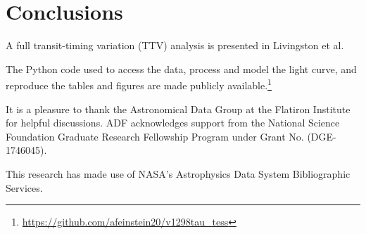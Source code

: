 \documentclass[twocolumn]{aastex631}
\begin{document}
\section{Conclusions} \label{sec:conclusions}

A full transit-timing variation (TTV) analysis is presented in Livingston et al. 


The Python code used to access the data, process and model the light curve, and reproduce the tables and figures are made publicly available.\footnote{\url{https://github.com/afeinstein20/v1298tau_tess}}


\begin{acknowledgments}
It is a pleasure to thank the Astronomical Data Group at the Flatiron Institute for helpful discussions. ADF acknowledges support from the National Science Foundation Graduate Research Fellowship Program under Grant No. (DGE-1746045).

This research has made use of NASA's Astrophysics Data System Bibliographic Services.
\end{acknowledgments}

{}

\end{document}
